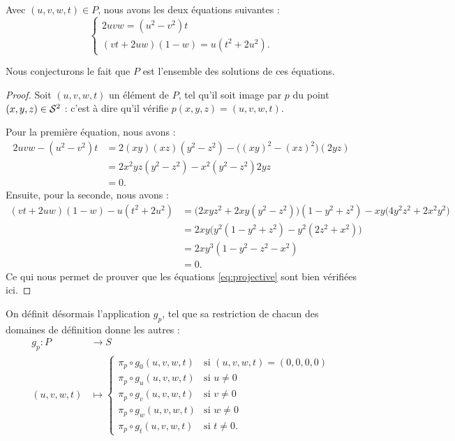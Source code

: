 \documentclass[hidelinks, 10pt]{article}
\begin{document}
\begin{proposition}
Avec $(u,v,w,t)\in P$, nous avons les deux équations suivantes : \begin{equation}\label{eq:projective}
\left\{\begin{matrix}
2uvw=(u^2-v^2)t\\ 
(vt+2uw)(1-w)=u(t^2+2u^2).
\end{matrix}\right.
\end{equation}
\end{proposition}
Nous conjecturons le fait que $P$ est l'ensemble des solutions de ces équations.
\begin{proof}
Soit $(u,v,w,t)$ un élément de $P$, tel qu'il soit image par $p$ du point $(x,y,z)\in\mathcal{S}^{2}$ : c'est à dire qu'il vérifie $p(x,y,z)=(u,v,w,t)$.

Pour la première équation, nous avons : \[\begin{split}
    2uvw-(u^2-v^2)t&=2(xy)(xz)(y^2-z^2)-\big((xy)^2-(xz)^2\big)(2yz)\\
    &=2x^2yz(y^2-z^2)-x^2(y^2-z^2)2yz\\
    &=0.
\end{split}\]Ensuite, pour la seconde, nous avons : \[\begin{split}
    (vt+2uw)(1-w)-u(t^2+2u^2)&=\big(2xyz^2+2xy(y^2-z^2)\big)(1-y^2+z^2)-xy\big(4y^2z^2+2x^2y^2\big)\\
    &=2xy\big(y^2(1-y^2+z^2)-y^2(2z^2+x^2)\big)\\
    &=2xy^3(1-y^2-z^2-x^2)\\
    &=0.
\end{split}\]Ce qui nous permet de prouver que les équations \eqref{eq:projective} sont bien vérifiées ici.
\end{proof}

On définit désormais l'application $g_p$, tel que sa restriction de chacun des domaines de définition donne les autres : \[\begin{split}
    g_p:P&\longrightarrow S\\
(u,v,w,t)&\mapsto\left\{\begin{matrix}
\pi_p\circ g_0(u,v,w,t) &\text{si }(u,v,w,t)=(0,0,0,0) \\ 
\pi_p\circ g_u(u,v,w,t) &\text{si }u\neq 0 \\ 
\pi_p\circ g_v(u,v,w,t) &\text{si }v\neq 0 \\ 
\pi_p\circ g_w(u,v,w,t) &\text{si }w\neq 0 \\ 
\pi_p\circ g_t(u,v,w,t) &\text{si }t\neq 0.
\end{matrix}\right.
\end{split}\]
\end{document}
